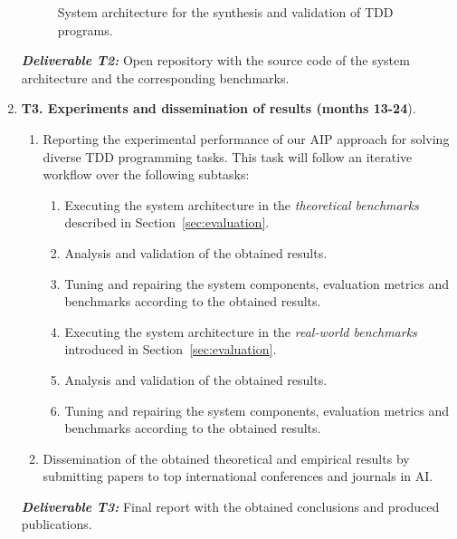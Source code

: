 \documentclass[10pt,a4paper]{paper}
\begin{document}
\begin{enumerate}
\begin{figure}[hbt!]
\begin{center}
\end{center}  
\caption{\small System architecture for the synthesis and validation of TDD programs.}
\label{fig:architecture}
\end{figure}

{\small{\bf\em Deliverable T2:} Open repository with the source code of the system architecture and the corresponding benchmarks.}
    
\item {\bf T3. Experiments and dissemination of results (months 13-24}).
   \begin{small}
      \begin{enumerate}
      \item Reporting the experimental performance of our AIP approach for solving diverse TDD programming tasks. This task will follow an iterative workflow over the following subtasks:
      \begin{enumerate}
      \item Executing the system architecture in the {\em theoretical benchmarks} described in Section~\ref{sec:evaluation}.
      \item Analysis and validation of the obtained results.
      \item Tuning and repairing the system components, evaluation metrics and benchmarks according to the obtained results.                 
      \item Executing the system architecture in the {\em real-world benchmarks} introduced in Section~\ref{sec:evaluation}.
      \item Analysis and validation of the obtained results.         
      \item Tuning and repairing the system components, evaluation metrics and benchmarks according to the obtained results.                 
      \end{enumerate}
      \item Dissemination of the obtained theoretical and empirical results by submitting papers to top international conferences and journals in AI.        
      \end{enumerate}
\end{small}        
{\small{\bf\em  Deliverable T3:} Final report with the obtained conclusions and produced publications.}
\end{enumerate}
\end{document}
